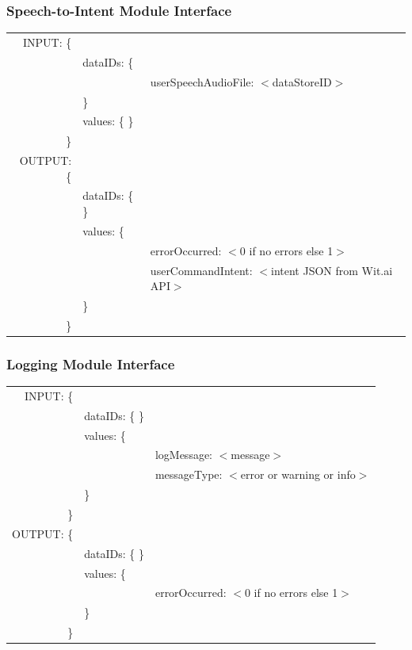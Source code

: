 \documentclass[onecolumn, draftclsnofoot,10pt, compsoc]{IEEEtran}
\begin{document}
        \subsubsection{Speech-to-Intent Module Interface}
            \begin{tabular}[t]{r l p{4.5in}}
                INPUT: \{ & & \\
                & dataIDs: \{ & \\
                & & userSpeechAudioFile: $<$dataStoreID$>$ \\
                & \} & \\
                & values: \{ \} & \\
                \} & & \\
                OUTPUT: \{ & & \\
                & dataIDs: \{ \} & \\
                & values: \{ & \\
                & & errorOccurred: $<$0 if no errors else 1$>$ \\
                & & userCommandIntent: $<$intent JSON from Wit.ai API$>$ \\
                & \} & \\
                \} & & \\
            \end{tabular}

        \subsubsection{Logging Module Interface}
            \begin{tabular}[t]{r l p{4.5in}}
                INPUT: \{ & & \\
                & dataIDs: \{ \} & \\
                & values: \{ & \\
                & & logMessage: $<$message$>$ \\
                & & messageType: $<$error or warning or info$>$ \\
                & \} & \\
                \} & & \\
                OUTPUT: \{ & & \\
                & dataIDs: \{ \} & \\
                & values: \{ & \\
                & & errorOccurred: $<$0 if no errors else 1$>$ \\
                & \} & \\
                \} & & \\
            \end{tabular}
\end{document}
